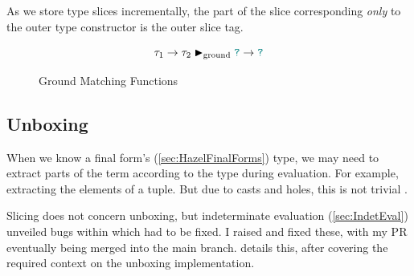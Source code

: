 As we store type slices incrementally, the part of the slice corresponding \textit{only} to the outer type constructor is the outer slice tag.

\begin{figure}
\[\tau_1 \to \tau_2 \blacktriangleright_{\text{ground}} {\color{teal}\texttt{?}} \to {\color{teal}\texttt{?}}\]
\caption{Ground Matching Functions}
\label{fig:GroundFunction}
\end{figure}

\subsection{Unboxing}
When we know a final form's (\cref{sec:HazelFinalForms}) type, we may need to extract parts of the term according to the type during evaluation. For example, extracting the elements of a tuple. But due to casts and holes, this is not trivial \cite{LivePatternMatching}.

Slicing does not concern unboxing, but indeterminate evaluation (\cref{sec:IndetEval}) unveiled bugs within which had to be fixed. I raised and fixed these, with my PR eventually being merged into the main branch.  details this, after covering the required context on the unboxing implementation.

